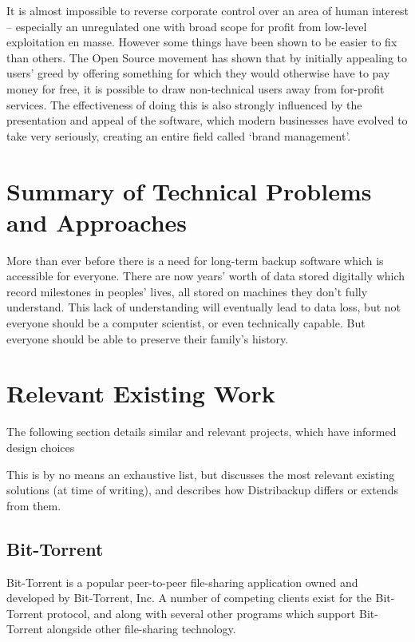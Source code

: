 \documentclass[12pt,a4paper,]{adreport}
\begin{document}
It is almost impossible to reverse corporate control over an area of
human interest -- especially an unregulated one with broad scope for
profit from low-level exploitation en masse. However some things have
been shown to be easier to fix than others. The Open Source movement has
shown that by initially appealing to users' greed by offering something
for which they would otherwise have to pay money for free, it is
possible to draw non-technical users away from for-profit services. The
effectiveness of doing this is also strongly influenced by the
presentation and appeal of the software, which modern businesses have
evolved to take very seriously, creating an entire field called `brand
management'.

\section{Summary of Technical Problems and
Approaches}\label{summary-of-technical-problems-and-approaches}

More than ever before there is a need for long-term backup software
which is accessible for everyone. There are now years' worth of data
stored digitally which record milestones in peoples' lives, all stored
on machines they don't fully understand. This lack of understanding will
eventually lead to data loss, but not everyone should be a computer
scientist, or even technically capable. But everyone should be able to
preserve their family's history.

\section{Relevant Existing Work}\label{relevant-existing-work}

The following section details similar and relevant projects, which have
informed design choices

This is by no means an exhaustive list, but discusses the most relevant
existing solutions (at time of writing), and describes how Distribackup
differs or extends from them.

\subsection{Bit-Torrent}\label{bit-torrent}

Bit-Torrent is a popular peer-to-peer file-sharing application owned and
developed by Bit-Torrent, Inc. A number of competing clients exist for
the Bit-Torrent protocol, and along with several other programs which
support Bit-Torrent alongside other file-sharing technology.
\end{document}

